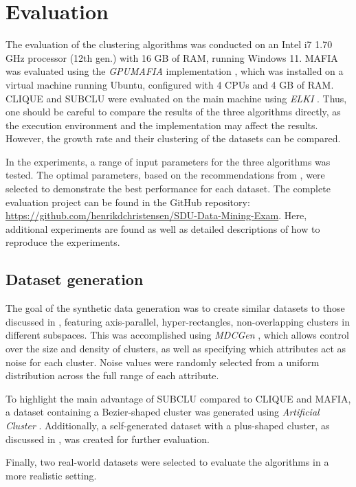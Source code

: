 \section{Evaluation}
The evaluation of the clustering algorithms was conducted on an Intel i7 1.70 GHz processor (12th gen.) with 16 GB of RAM, running Windows 11. MAFIA was evaluated using the \textit{GPUMAFIA} implementation \cite{gpumafia}, which was installed on a virtual machine running Ubuntu, configured with 4 CPUs and 4 GB of RAM. CLIQUE and SUBCLU were evaluated on the main machine using \textit{ELKI} \cite{elki}. Thus, one should be careful to compare the results of the three algorithms directly, as the execution environment and the implementation may affect the results. However, the growth rate and their clustering of the datasets can be compared.

In the experiments, a range of input parameters for the three algorithms was tested. The optimal parameters, based on the recommendations from \cite[p.~352]{sim-2012}, were selected to demonstrate the best performance for each dataset. The complete evaluation project can be found in the GitHub repository: \url{https://github.com/henrikdchristensen/SDU-Data-Mining-Exam}. Here, additional experiments are found as well as detailed descriptions of how to reproduce the experiments.

\subsection{Dataset generation}
The goal of the synthetic data generation was to create similar datasets to those discussed in \cite{clique,mafia}, featuring axis-parallel, hyper-rectangles, non-overlapping clusters in different subspaces. This was accomplished using \textit{MDCGen} \cite{mdcgen}, which allows control over the size and density of clusters, as well as specifying which attributes act as noise for each cluster. Noise values were randomly selected from a uniform distribution across the full range of each attribute.

To highlight the main advantage of SUBCLU compared to CLIQUE and MAFIA, a dataset containing a Bezier-shaped cluster was generated using \textit{Artificial Cluster} \cite{ac}. Additionally, a self-generated dataset with a plus-shaped cluster, as discussed in \cite{mafia}, was created for further evaluation.

Finally, two real-world datasets were selected to evaluate the algorithms in a more realistic setting.

